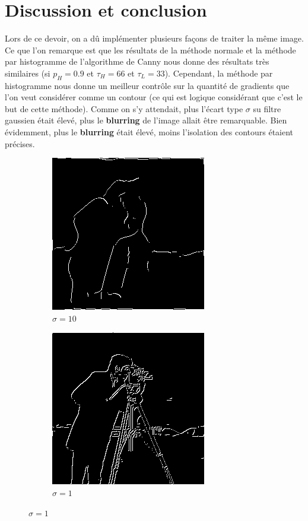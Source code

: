 \documentclass{article}
\begin{document}
\section*{Discussion et conclusion}
Lors de ce devoir, on a dû implémenter plusieurs façons de traiter la même image. Ce que l'on remarque est que les résultats de la méthode normale
et la méthode par histogramme de l'algorithme de Canny nous donne des résultats très similaires (si $p_H = 0.9$ et $\tau_H = 66$ et $\tau_L = 33$). 
Cependant, la méthode par histogramme nous donne un meilleur contrôle sur la quantité de gradients que l'on veut considérer comme un contour
(ce qui est logique considérant que c'est le but de cette méthode). Comme on s'y attendait, plus l'écart type $\sigma$ su filtre gaussien était élevé,
plus le \textbf{blurring} de l'image allait être remarquable. Bien évidemment, plus le \textbf{blurring} était élevé, moins l'isolation des contours étaient 
précises.
\begin{figure}[H]
    \begin{subfigure}[b]{0.45\linewidth}
        \centering
        \includegraphics[scale = 0.5]{TpIFT6150-2-canny_10.png}
        \caption{$\sigma = 10$}
    \end{subfigure}
    \begin{subfigure}[b]{0.45\linewidth}
        \centering
        \includegraphics[scale = 0.5]{TpIFT6150-2-canny_09.png}
        \caption{$\sigma = 1$}
    \end{subfigure}
\end{figure}
\end{document}
